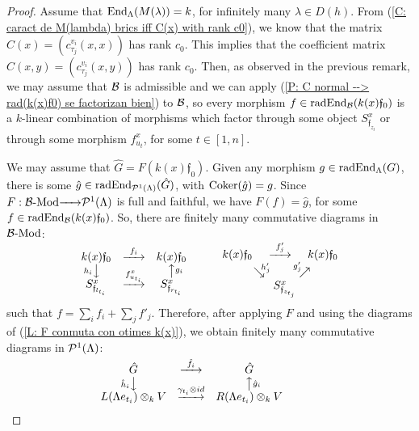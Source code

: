\documentclass{article}
\theoremstyle{definition}
\newcommand{\End}{{ \rm End }}
\newcommand{\Coker}{{ \rm Coker }}
\newcommand{\Mod}{{ \rm Mod }}
\newcommand{\rad}{{ \rm rad }}
\renewcommand{\frak}{\mathfrak}
\newcommand{\g}{\hbox{-}}
\newcommand{\rightmap}[1]{\smash{\mathop{\hbox to 
20pt{\rightarrowfill}}\limits^{#1}}}
\newcommand{\shortlmapdown}[1]
{\llap{$\vcenter{\hbox{$\scriptstyle#1$}}$}\big\downarrow}
\newcommand{\shortrmapup}[1]
{\big\uparrow\rlap{$\vcenter{\hbox{$\scriptstyle#1$}}$}}
\newcommand{\ddmapdown}[1]
{\hskip-5pt\mathop{\searrow\hskip-6pt\raise5pt\hbox{$\scriptstyle#1$}}}
\newcommand{\ddmapup}[1]
{\hskip-8pt\mathop{\hskip-5pt\raise6pt\hbox{$\scriptstyle#1$}\hskip-5pt\nearrow}
}
\begin{document}
\begin{proof} Assume that 
$\End_\Lambda(M(\lambda))=k$, for infinitely many $\lambda\in D(h)$. From (\ref{C: caract de M(lambda) brics iff C(x) with rank c0}), we know that the  matrix $C(x)=(c^{v_i}_{\tau_j}(x,x))$ has rank $c_0$. This implies that the coefficient matrix $C(x,y)=(c^{v_i}_{\tau_j}(x,y))$ has rank $c_0$. Then, as observed in the previous remark, we may assume that ${\cal B}$ is admissible and we can apply (\ref{P: C normal --> rad(k(x)f0) se factorizan bien}) to ${\cal B}$, so every morphism  
$f\in \rad \End_{\cal B}(k(x)\frak{f}_0)$ is a $k$-linear combination of morphisms which factor through some object $S^x_{\frak{f}_{z_t}}$ or through some morphism $f^x_{u_t}$, for some $t\in [1,n]$. 

We may assume that $\hat{G}=F(k(x)\frak{f}_0)$. Given any morphism $g\in \rad\End_\Lambda(G)$, there is some $\hat{g}\in \rad\End_{{\cal P}^1(\Lambda)}(\hat{G})$, with $\Coker(\hat{g})=g$. Since $F:{\cal B}\g\Mod\rightmap{}{\cal P}^1(\Lambda)$ is full and faithful, we have $F(f)=\hat{g}$, for some $f\in\rad\End_{\cal B}(k(x)\frak{f}_0)$. So, there are finitely many commutative diagrams in ${\cal B}\g\Mod$: 
$$\begin{matrix}
k(x)\frak{f}_0&\rightmap{f_i}&k(x)\frak{f}_0\\
\shortlmapdown{h_i}&&\shortrmapup{g_i}\\
S^x_{\frak{f}_{l_{t_i}} }&\rightmap{f^x_{u_{t_i}}}&
S^x_{\frak{f}_{r_{t_i}} }
\end{matrix} \hbox{ \hskip 1cm}
\begin{matrix}
k(x)\frak{f}_0\hbox{\hskip-.5cm}&\hbox{\hskip.5cm}\rightmap{\ f'_j \ }&k(x)\frak{f}_0\\
&\ddmapdown{h'_j}\hbox{\hskip.4cm}&\ddmapup{g'_j}\hbox{\hskip.8cm}\\
&\hbox{\hskip .8cm}S^x_{\frak{f}_{z_{t_j}}}&\\
\end{matrix}$$
such that $f=\sum_if_i+\sum_jf'_j$. 
Therefore, after applying $F$ and using the diagrams of (\ref{L: F conmuta con otimes k(x)}), we obtain finitely many commutative diagrams in ${\cal P}^1(\Lambda)$: 
$$\begin{matrix}
\hat{G}&\rightmap{\hat{f}_i}&\hat{G}\\
\shortlmapdown{\hat{h}_i}&&\shortrmapup{\hat{g}_i}\\
L(\Lambda e_{t_i})\otimes_kV
&\rightmap{\gamma_{t_i}\otimes id}&
R(\Lambda e_{t_i})\otimes_kV 
\end{matrix} 
\hbox{ \hskip 1cm}
$$
\end{proof}
\end{document}
